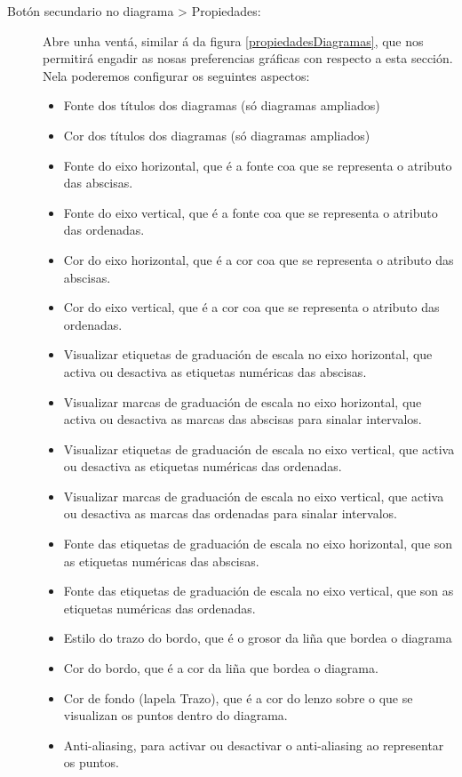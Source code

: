 \begin{description}
\item[Botón secundario no diagrama \textgreater{} Propiedades:] \hfill
Abre unha ventá, similar á da figura \ref{propiedadesDiagramas}, que nos permitirá engadir as nosas preferencias gráficas con respecto a esta sección. Nela poderemos configurar os seguintes aspectos:
\begin{itemize}
\item Fonte dos títulos dos diagramas (só diagramas ampliados)
\item Cor dos títulos dos diagramas (só diagramas ampliados)
\item Fonte do eixo horizontal, que é a fonte coa que se representa o atributo das abscisas.
\item Fonte do eixo vertical, que é a fonte coa que se representa o atributo das ordenadas.
\item Cor do eixo horizontal, que é a cor coa que se representa o atributo das abscisas.
\item Cor do eixo vertical, que é a cor coa que se representa o atributo das ordenadas.
\item Visualizar etiquetas de graduación de escala no eixo horizontal, que activa ou desactiva as etiquetas numéricas das abscisas.
\item Visualizar marcas de graduación de escala no eixo horizontal, que activa ou desactiva as marcas das abscisas para sinalar intervalos.
\item Visualizar etiquetas de graduación de escala no eixo vertical, que activa ou desactiva as etiquetas numéricas das ordenadas.
\item Visualizar marcas de graduación de escala no eixo vertical, que activa ou desactiva as marcas das ordenadas para sinalar intervalos.
\item Fonte das etiquetas de graduación de escala no eixo horizontal, que son as etiquetas numéricas das abscisas.
\item Fonte das etiquetas de graduación de escala no eixo vertical, que son as etiquetas numéricas das ordenadas.
\item Estilo do trazo do bordo, que é o grosor da liña que bordea o diagrama
\item Cor do bordo, que é a cor da liña que bordea o diagrama.
\item Cor de fondo (lapela Trazo), que é a cor do lenzo sobre o que se visualizan os puntos dentro do diagrama.
\item Anti-aliasing, para activar ou desactivar o anti-aliasing ao representar os puntos.

\end{itemize}
\end{description}
